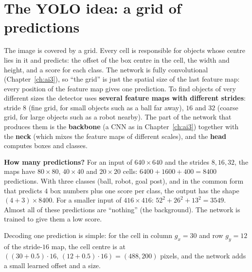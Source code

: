 \section*{The YOLO idea: a grid of predictions}
The image is covered by a grid. Every cell is responsible for objects whose centre lies in it and predicts: the offset of the box centre in the cell, the width and height, and a score for each class. The network is fully convolutional (Chapter~\ref{ch:ai3}), so ``the grid'' is just the spatial size of the last feature map: every position of the feature map gives one prediction. To find objects of very different sizes the detector uses \textbf{several feature maps with different strides}: stride $8$ (fine grid, for small objects such as a ball far away), $16$ and $32$ (coarse grid, for large objects such as a robot nearby). The part of the network that produces them is the \textbf{backbone} (a CNN as in Chapter~\ref{ch:ai3}) together with the \textbf{neck} (which mixes the feature maps of different scales), and the \textbf{head} computes boxes and classes.
\begin{center}
\end{center}
\begin{example}
\textbf{How many predictions?} For an input of $640\times640$ and the strides $8,16,32$, the maps have $80\times80$, $40\times40$ and $20\times20$ cells: $6400+1600+400=8400$ predictions. With three classes (ball, robot, goal post), and in the common form that predicts $4$ box numbers plus one score per class, the output has the shape $(4+3)\times8400$. For a smaller input of $416\times416$: $52^2+26^2+13^2=3549$. Almost all of these predictions are ``nothing'' (the background). The network is trained to give them a low score.
\end{example}
Decoding one prediction is simple: for the cell in column $g_x=30$ and row $g_y=12$ of the stride-$16$ map, the cell centre is at $((30+0.5)\cdot16,\,(12+0.5)\cdot16)=(488,200)$ pixels, and the network adds a small learned offset and a size.

